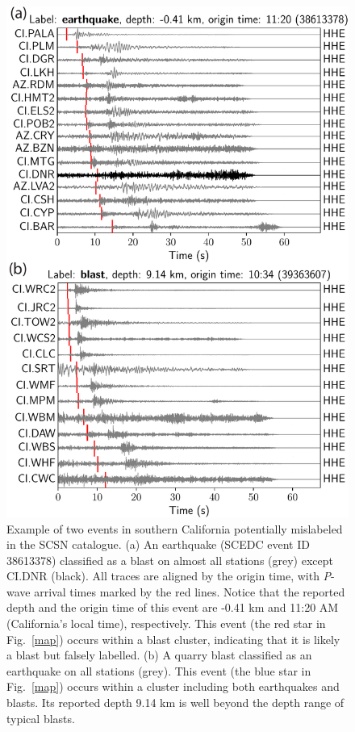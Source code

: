 \documentclass{gji}
\begin{document}
\begin{figure}
\centering
\includegraphics[width=.8\textwidth]{mislabelling.pdf}
\caption{Example of two events in southern California potentially mislabeled in the SCSN catalogue. (a) An earthquake (SCEDC event ID 38613378) classified as a blast on almost all stations (grey) except CI.DNR (black). All traces are aligned by the origin time, with \textit{P}-wave arrival times marked by the red lines. Notice that the reported depth and the origin time of this event are -0.41 km and 11:20 AM (California's local time), respectively. This event (the red star in Fig.~\ref{map}) occurs within a blast cluster, indicating that it is likely a blast but falsely labelled. (b) A quarry blast classified as an earthquake on all stations (grey). This event (the blue star in Fig.~\ref{map}) occurs within a cluster including both earthquakes and blasts. Its reported depth 9.14 km is well beyond the depth range of typical blasts.}
\label{mislabel}
\end{figure}
\end{document}
